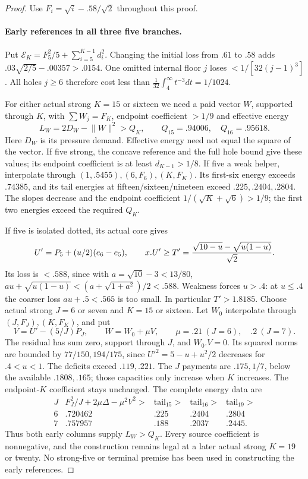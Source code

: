 \documentclass[11pt]{article}
\theoremstyle{definition}
\theoremstyle{remark}
\newcommand{\norm}[1]{\lVert #1\rVert}
\begin{document}
\begin{proof}
Use $F_i=\sqrt i-.58/\sqrt2$ throughout this proof.

\paragraph{Early references in all three five branches.}
Put $\mathcal E_K=F_5^2/5+\sum_{i=5}^{K-1}d_i^2$.
Changing the initial loss from $.61$ to $.58$ adds
$ .03\sqrt{2/5}-.00357>.0154$.
One omitted internal floor $j$ loses $<1/[32(j-1)^3]$.
All holes $j\ge6$ therefore cost less than
$\frac1{32}\int_4^\infty t^{-3}dt=1/1024$.

For either actual strong $K=15$ or sixteen we need a paid vector
$W$, supported through $K$, with $\sum W_j=F_K$, endpoint
coefficient $>1/9$ and effective energy
\[
 L_W=2D_W-\norm W^2>Q_K,\qquad Q_{15}=.94006,\quad Q_{16}=.95618.
\]
Here $D_W$ is its pressure demand. Effective energy need not equal
the square of the vector.
If five strong, the concave reference and the full hole bound give
these values; its endpoint coefficient is at least $d_{K-1}>1/8$.
If five a weak helper, interpolate through $(1,.5455),(6,F_6),(K,F_K)$.
Its first-six energy exceeds $.74385$, and its tail energies at
fifteen/sixteen/nineteen exceed $.225,.2404,.2804$.
The slopes decrease and the endpoint coefficient
$1/(\sqrt K+\sqrt6)>1/9$; the first two energies exceed the required
$Q_K$.

If five is isolated dotted, its actual core gives
\[
 U'=P_5+(u/2)(e_6-e_5),\qquad
 x.U'\ge T'={\sqrt{10-u}-\sqrt{u(1-u)}\over\sqrt2}.
\]
Its loss is $<.588$, since with $a=\sqrt{10}-3<13/80$,
$au+\sqrt{u(1-u)}<(a+\sqrt{1+a^2})/2<.588$.
Weakness forces $u>.4$: at $u\le.4$ the coarser loss
$au+.5<.565$ is too small. In particular $T'>1.8185$.
Choose actual strong $J=6$ or seven and $K=15$ or sixteen.
Let $W_0$ interpolate through $(J,F_J),(K,F_K)$, and put
\[
 V=U'-(5/J)P_J,\qquad W=W_0+\mu V,
 \qquad \mu=.21\ (J=6),\quad .2\ (J=7).
\]
The residual has sum zero, support through $J$, and $W_0.V=0$.
Its squared norms are bounded by $77/150,194/175$, since
$U'^2=5-u+u^2/2$ decreases for $.4<u<1$.
The deficits exceed $.119,.221$. The $J$ payments are $.175,1/7$,
below the available $.1808,.165$; those capacities only increase
when $K$ increases. The endpoint-$K$ coefficient stays unchanged.
The complete energy data are
\[
\begin{array}{c|c|c|c|c}
J&F_J^2/J+2\mu\Delta-\mu^2V^2>&\text{tail}_{15}>&
 \text{tail}_{16}>&\text{tail}_{19}>\\\hline
6&.720462&.225&.2404&.2804\\7&.757957&.188&.2037&.2445 .
\end{array}
\]
Thus both early columns supply $L_W>Q_K$. Every source coefficient
is nonnegative, and the construction remains legal at a later actual
strong $K=19$ or twenty. No strong-five or terminal premise has been
used in constructing the early references.


\end{proof}
\end{document}
